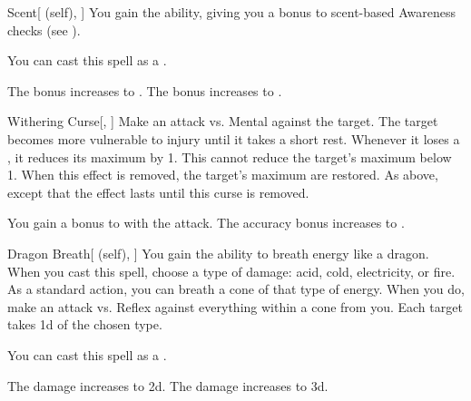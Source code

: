 \lowercase{\hypertarget{spell:Scent}{}}\label{spell:Scent}
\begin{attuneability}[Rank 3]{\hypertarget{spell:Scent}{Scent}}[ (self), ]
You gain the  ability, giving you a  bonus to scent-based Awareness checks (see ).

You can cast this spell as a .

\rankline
{} The bonus increases to .
 The bonus increases to .
\end{attuneability}
\vspace{0.25em}



\lowercase{\hypertarget{spell:Withering Curse}{}}\label{spell:Withering Curse}
\begin{freeability}[Rank 3]{\hypertarget{spell:Withering Curse}{Withering Curse}}[, ]
Make an attack vs. Mental against the target.
\hit The target becomes more vulnerable to injury until it takes a short rest.
Whenever it loses a , it reduces its maximum  by 1.
This cannot reduce the target's maximum  below 1.
When this effect is removed, the target's maximum  are restored.
\crit As above, except that the effect lasts until this curse is removed.

\rankline
{} You gain a  bonus to  with the attack.
 The accuracy bonus increases to .
\end{freeability}
\vspace{0.25em}



\lowercase{\hypertarget{spell:Dragon Breath}{}}\label{spell:Dragon Breath}
\begin{attuneability}[Rank 4]{\hypertarget{spell:Dragon Breath}{Dragon Breath}}[ (self), ]
You gain the ability to breath energy like a dragon.
When you cast this spell, choose a type of damage: acid, cold, electricity, or fire.
As a standard action, you can breath a cone of that type of energy.
When you do, make an attack vs. Reflex against everything within a \arealarge cone from you.
\hit Each target takes  \plus1d of the chosen type.

You can cast this spell as a .

\rankline
{} The damage increases to  \plus2d.
 The damage increases to  \plus3d.
\end{attuneability}
\vspace{0.25em}



